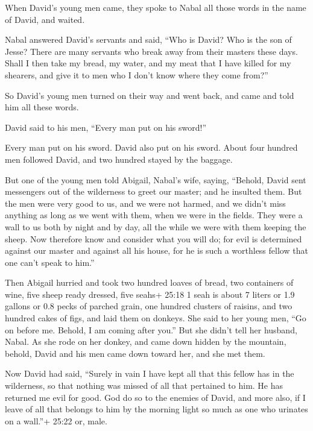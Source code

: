  When David's young men came, they spoke to Nabal all those
words in the name of David, and waited.

 Nabal answered David's servants and said, ``Who is David?
Who is the son of Jesse? There are many servants who break away from
their masters these days.  Shall I then take my bread, my
water, and my meat that I have killed for my shearers, and give it to
men who I don't know where they come from?''

 So David's young men turned on their way and went back,
and came and told him all these words.

 David said to his men, ``Every man put on his sword!''

Every man put on his sword. David also put on his sword. About four
hundred men followed David, and two hundred stayed by the baggage.

 But one of the young men told Abigail, Nabal's wife,
saying, ``Behold, David sent messengers out of the wilderness to greet
our master; and he insulted them.  But the men were very
good to us, and we were not harmed, and we didn't miss anything as long
as we went with them, when we were in the fields.  They
were a wall to us both by night and by day, all the while we were with
them keeping the sheep.  Now therefore know and consider
what you will do; for evil is determined against our master and against
all his house, for he is such a worthless fellow that one can't speak to
him.''

 Then Abigail hurried and took two hundred loaves of bread,
two containers of wine, five sheep ready dressed, five seahs+ 25:18 1
seah is about 7 liters or 1.9 gallons or 0.8 pecks of parched grain, one
hundred clusters of raisins, and two hundred cakes of figs, and laid
them on donkeys.  She said to her young men, ``Go on before
me. Behold, I am coming after you.'' But she didn't tell her husband,
Nabal.  As she rode on her donkey, and came down hidden by
the mountain, behold, David and his men came down toward her, and she
met them.

 Now David had said, ``Surely in vain I have kept all that
this fellow has in the wilderness, so that nothing was missed of all
that pertained to him. He has returned me evil for good. 
God do so to the enemies of David, and more also, if I leave of all that
belongs to him by the morning light so much as one who urinates on a
wall.''+ 25:22 or, male.

